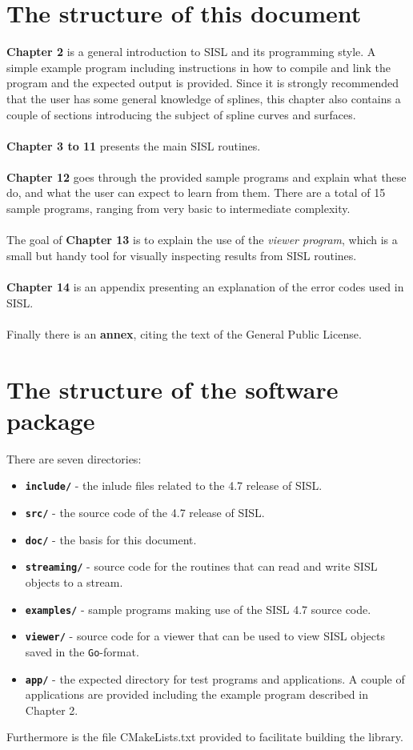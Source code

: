 \section{The structure of this document}
\textbf{Chapter 2} is a general introduction to SISL and its programming style. A simple example program
including instructions in how to compile and link the program and the expected output is provided.
Since it is strongly recommended that the user has some general knowledge of splines, this 
chapter also contains a couple of sections introducing the subject of spline curves and
surfaces. \\
\\
\textbf{Chapter 3 to 11} presents the main SISL routines.  \\
\\
\textbf{Chapter 12} goes through the provided sample programs and explain what these do,
and what the user can expect to learn from them.  There are a total of 15 sample 
programs, ranging from very basic to intermediate complexity.\\
\\
The goal of \textbf{Chapter 13} is to explain the use of the \emph{viewer program}, 
which is a small but handy tool for visually inspecting results from SISL routines.\\
\\
\textbf{Chapter 14} is an appendix presenting an explanation of the error codes used in SISL.\\
\\
Finally there is an \textbf{annex}, citing the text of the General Public License.

\section{The structure of the software package}\label{compile}
There are seven directories:
\begin{itemize}
\item \textbf{\Verb-include/-} - the inlude files related to the 4.7 release of SISL.
\item \textbf{\Verb-src/-} - the source code of the 4.7 release of SISL.
\item \textbf{\Verb-doc/-} - the basis for this document. 
\item \textbf{\Verb-streaming/-} - source code for the routines that can read and write
SISL objects to a stream.
\item \textbf{\Verb-examples/-} - sample programs making use of the SISL 4.7 source code.
\item \textbf{\Verb-viewer/-} - source code for a viewer that can be used to view SISL 
  objects saved in the \verb/Go/-format.
\item \textbf{\Verb-app/-} - the expected directory for test programs and applications. A
  couple of applications are provided including the example program described in Chapter 2.
\end{itemize}
Furthermore is the file CMakeLists.txt provided to facilitate building the library.

